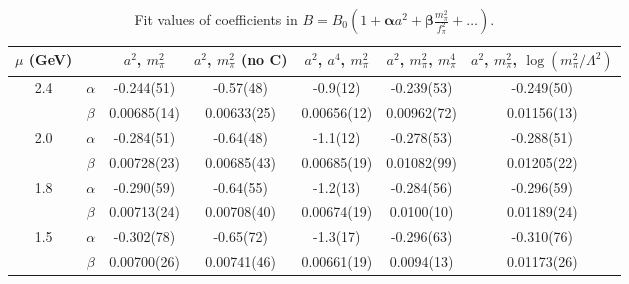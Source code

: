 \documentclass[12pt]{extarticle}
\begin{document}
\begin{table}[h!]
\begin{center}
\begin{tabular}{|c c|c|c|c|c|c|}
\hline
$\mu$ (GeV) &  & $a^2$, $m_\pi^2$& $a^2$, $m_\pi^2$ (no C)& $a^2$, $a^4$, $m_\pi^2$& $a^2$, $m_\pi^2$, $m_\pi^4$& $a^2$, $m_\pi^2$, $\log(m_\pi^2/\Lambda^2)$\\
\hline
\multirow{2}{0.5in}{2.4} & $\alpha$ & -0.244(51)& -0.57(48)& -0.9(12)& -0.239(53)& -0.249(50)\\
 & $\beta$ & 0.00685(14)& 0.00633(25)& 0.00656(12)& 0.00962(72)& 0.01156(13)\\
\hline
\multirow{2}{0.5in}{2.0} & $\alpha$ & -0.284(51)& -0.64(48)& -1.1(12)& -0.278(53)& -0.288(51)\\
 & $\beta$ & 0.00728(23)& 0.00685(43)& 0.00685(19)& 0.01082(99)& 0.01205(22)\\
\hline
\multirow{2}{0.5in}{1.8} & $\alpha$ & -0.290(59)& -0.64(55)& -1.2(13)& -0.284(56)& -0.296(59)\\
 & $\beta$ & 0.00713(24)& 0.00708(40)& 0.00674(19)& 0.0100(10)& 0.01189(24)\\
\hline
\multirow{2}{0.5in}{1.5} & $\alpha$ & -0.302(78)& -0.65(72)& -1.3(17)& -0.296(63)& -0.310(76)\\
 & $\beta$ & 0.00700(26)& 0.00741(46)& 0.00661(19)& 0.0094(13)& 0.01173(26)\\
\hline
\end{tabular}
\caption{Fit values of coefficients in $B = B_0(1 + \mathbf{\alpha} a^2 + \mathbf{\beta} \frac{m_\pi^2}{f_\pi^2} + \ldots)$.}
\end{center}
\end{table}




















\clearpage
\end{document}
